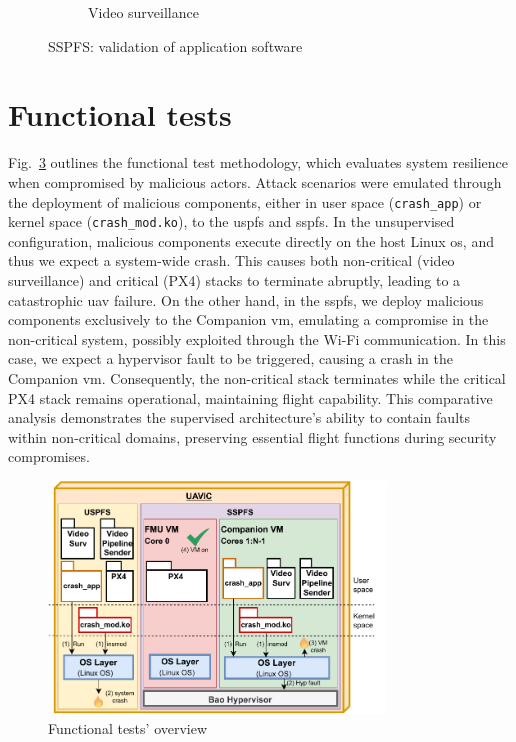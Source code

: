 \begin{figure}[!hbt]
\begin{subfigure}[t]{0.49\textwidth}
    \caption{Video surveillance}%
    \label{fig:sspfs-app-validation-2}
  \end{subfigure}
  \caption{SSPFS: validation of application software}
  \label{fig:sspfs-app-validation}
\end{figure}



\section{Functional tests}
\label{sec:functional-tests}
Fig.~\ref{fig:uav-main-eval-kmod} outlines the functional test methodology,
which evaluates system resilience when compromised by malicious actors. Attack
scenarios were emulated through the deployment of malicious components, either
in user space (\lstinline{crash_app}) or kernel space
(\lstinline{crash_mod.ko}), to the \gls{uspfs} and \gls{sspfs}.
In the unsupervised configuration, malicious components execute directly on the
host Linux \gls{os}, and thus we expect a system-wide crash. This causes both
non-critical (video surveillance) and critical (PX4) stacks to terminate
abruptly, leading to a catastrophic \gls{uav} failure. On the other hand, in the
\gls{sspfs}, we deploy malicious components exclusively to the Companion
\gls{vm}, emulating a compromise in the non-critical system, possibly exploited
through the Wi-Fi communication. In this case, we expect a hypervisor fault
to be triggered, causing a crash in the Companion \gls{vm}. Consequently, the
non-critical stack terminates while the critical PX4 stack remains operational,
maintaining flight capability.
%
This comparative analysis demonstrates the supervised architecture's ability to
contain faults within non-critical domains, preserving essential flight
functions during security compromises.

\begin{figure}[!hbt]
  \centering
  \includegraphics[width=0.8\textwidth]{./img/pdf/uav-main-eval-funcTest} 
%   
  \caption{Functional tests' overview}%
  \label{fig:uav-main-eval-kmod}
\end{figure}


